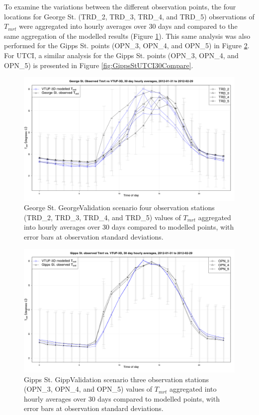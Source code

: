 \documentclass[final,3p,times,authoryear]{elsarticle}
\begin{document}
To examine the variations between the different observation points,  the four locations for George St. (TRD\_2, TRD\_3, TRD\_4, and TRD\_5) observations of $T_{mrt}$ were aggregated into hourly averages over 30 days and compared to the same aggregation of the modelled results (Figure \ref{fig:GeorgeSt30Compare}). This same analysis was also performed for the  Gipps St. points (OPN\_3, OPN\_4, and OPN\_5) in Figure \ref{fig:GippsSt30Compare}. For UTCI, a similar analysis for the Gipps St. points (OPN\_3, OPN\_4, and OPN\_5) is presented in Figure \ref{fig:GippsStUTCI30Compare}. 

\begin{figure}[!htbp]
\includegraphics[trim = 0mm 0mm 0mm 0mm, clip, scale=0.32]{images/GeorgeValidationTmrtOverallAve5_.png}
\caption{George St. GeorgeValidation scenario four observation stations (TRD\_2, TRD\_3, TRD\_4, and TRD\_5) values of $T_{mrt}$ aggregated into hourly averages over 30 days compared to modelled points, with error bars at observation standard deviations.\label{fig:GeorgeSt30Compare}} 
\end{figure}

\begin{figure}[!htbp]
\includegraphics[trim = 0mm 0mm 0mm 0mm, clip, scale=0.32]{images/GippValidationTmrtOverallAve5_.png}
\caption{Gipps St. GippValidation scenario three observation stations (OPN\_3, OPN\_4, and OPN\_5) values of $T_{mrt}$ aggregated into hourly averages over 30 days compared to modelled points, with error bars at observation standard deviations.\label{fig:GippsSt30Compare}}
\end{figure}
\end{document}

